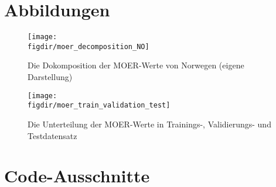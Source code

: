 \chapter{Abbildungen}
\begin{figure}
    \caption{Die Dokomposition der MOER-Werte von Norwegen (eigene Darstellung)}
    {\texttt{[image: \\figdir/moer\_decomposition\_NO]}}
    \label{FIG:moer_decomposition_NO}
\end{figure}

\begin{figure}
    \caption{Die Unterteilung der MOER-Werte in Trainings-, Validierungs- und Testdatensatz}
    {\texttt{[image: \\figdir/moer\_train\_validation\_test]}}
    \label{FIG:moer_train_validation_test}
\end{figure}


\chapter{Code-Ausschnitte}

